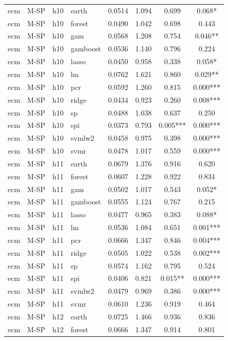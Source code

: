 \begin{ThreePartTable}
\begin{longtable}[t]{llclcccc}
\addlinespace
ecm & M-SP & h10 & earth & 0.0514 & 1.094 & 0.699 & 0.068*\\
ecm & M-SP & h10 & forest & 0.0490 & 1.042 & 0.698 & 0.443\\
ecm & M-SP & h10 & gam & 0.0568 & 1.208 & 0.754 & 0.046**\\
ecm & M-SP & h10 & gamboost & 0.0536 & 1.140 & 0.796 & 0.224\\
ecm & M-SP & h10 & lasso & 0.0450 & 0.958 & 0.338 & 0.058*\\
ecm & M-SP & h10 & lm & 0.0762 & 1.621 & 0.860 & 0.029**\\
ecm & M-SP & h10 & pcr & 0.0592 & 1.260 & 0.815 & 0.000***\\
ecm & M-SP & h10 & ridge & 0.0434 & 0.923 & 0.260 & 0.008***\\
ecm & M-SP & h10 & sp & 0.0488 & 1.038 & 0.637 & 0.250\\
ecm & M-SP & h10 & spi & 0.0373 & 0.793 & 0.005*** & 0.000***\\
ecm & M-SP & h10 & svmlw2 & 0.0458 & 0.975 & 0.398 & 0.000***\\
ecm & M-SP & h10 & svmr & 0.0478 & 1.017 & 0.559 & 0.000***\\
\addlinespace
ecm & M-SP & h11 & earth & 0.0679 & 1.376 & 0.916 & 0.620\\
ecm & M-SP & h11 & forest & 0.0607 & 1.228 & 0.922 & 0.834\\
ecm & M-SP & h11 & gam & 0.0502 & 1.017 & 0.543 & 0.052*\\
ecm & M-SP & h11 & gamboost & 0.0555 & 1.124 & 0.767 & 0.215\\
ecm & M-SP & h11 & lasso & 0.0477 & 0.965 & 0.383 & 0.088*\\
ecm & M-SP & h11 & lm & 0.0536 & 1.084 & 0.651 & 0.001***\\
ecm & M-SP & h11 & pcr & 0.0666 & 1.347 & 0.846 & 0.004***\\
ecm & M-SP & h11 & ridge & 0.0505 & 1.022 & 0.538 & 0.002***\\
ecm & M-SP & h11 & sp & 0.0574 & 1.162 & 0.795 & 0.524\\
ecm & M-SP & h11 & spi & 0.0406 & 0.821 & 0.015** & 0.000***\\
ecm & M-SP & h11 & svmlw2 & 0.0479 & 0.969 & 0.386 & 0.000***\\
ecm & M-SP & h11 & svmr & 0.0610 & 1.236 & 0.919 & 0.464\\
\addlinespace
ecm & M-SP & h12 & earth & 0.0725 & 1.466 & 0.936 & 0.836\\
ecm & M-SP & h12 & forest & 0.0666 & 1.347 & 0.914 & 0.801\\

\end{longtable}
\end{ThreePartTable}
